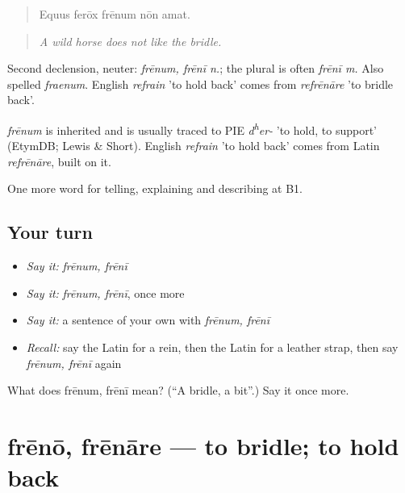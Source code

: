 \begin{quote}
Equus ferōx frēnum nōn amat.
\end{quote}

\begin{quote}
\emph{A wild horse does not like the bridle.}
\end{quote}

Second declension, neuter: \emph{frēnum, frēnī n.}; the plural is often \emph{frēnī m.} Also spelled \emph{fraenum}. English \emph{refrain} 'to hold back' comes from \emph{refrēnāre} 'to bridle back'.

\begin{cousinweb}
\emph{frēnum} is inherited and is usually traced to PIE \emph{d\textsuperscript{h}er-} 'to hold, to support' (EtymDB; Lewis \& Short). English \emph{refrain} 'to hold back' comes from Latin \emph{refrēnāre}, built on it.
\end{cousinweb}

\begin{grammarlens}[title={What you've built}]
One more word for telling, explaining and describing at B1.
\end{grammarlens}

\subsection*{Your turn}
\begin{itemize}
\raggedright
  \item \emph{Say it:} \emph{frēnum, frēnī}
  \item \emph{Say it:} \emph{frēnum, frēnī}, once more
  \item \emph{Say it:} a sentence of your own with \emph{frēnum, frēnī}
  \item \emph{Recall:} say the Latin for a rein, then the Latin for a leather strap, then say \emph{frēnum, frēnī} again
\end{itemize}

\begin{tcolorbox}[breakable,colback=teal!4,colframe=teal!35!black,title={Before you move on}]
What does frēnum, frēnī mean? (\textquotedblleft{}A bridle, a bit\textquotedblright{}.) Say it once more.
\end{tcolorbox}
\section[frēnō, frēnāre]{frēnō, frēnāre — to bridle; to hold back}

\label{lesson:LA-C431-freno}



